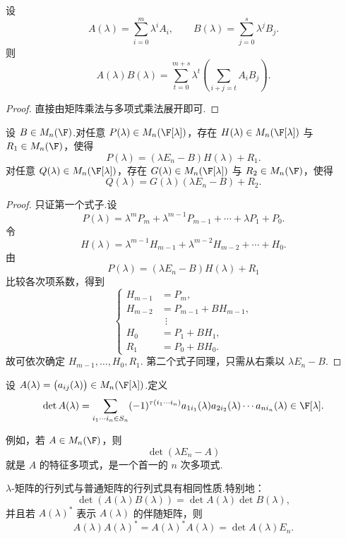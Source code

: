 \begin{lemma}
	设
	\[
	A(\lambda)=\sum_{i=0}^m\lambda^iA_i,
	\qquad
	B(\lambda)=\sum_{j=0}^s\lambda^jB_j.
	\]
	则
	\[
	A(\lambda)B(\lambda)
	=
	\sum_{t=0}^{m+s}\lambda^t
	\left(\sum_{i+j=t}A_iB_j\right).
	\]
\end{lemma}

\begin{proof}
	直接由矩阵乘法与多项式乘法展开即可.
\end{proof}

\begin{lemma}
	设 $B\in M_n(\F)$.对任意 $P(\lambda)\in M_n(\F[\lambda])$，存在 $H(\lambda)\in M_n(\F[\lambda])$ 与 $R_1\in M_n(\F)$，使得
	\[
	P(\lambda)=(\lambda E_n-B)H(\lambda)+R_1.
	\]
	对任意 $Q(\lambda)\in M_n(\F[\lambda])$，存在 $G(\lambda)\in M_n(\F[\lambda])$ 与 $R_2\in M_n(\F)$，使得
	\[
	Q(\lambda)=G(\lambda)(\lambda E_n-B)+R_2.
	\]
\end{lemma}

\begin{proof}
	只证第一个式子.设
	\[
	P(\lambda)=\lambda^mP_m+\lambda^{m-1}P_{m-1}+\cdots+\lambda P_1+P_0.
	\]
	令
	\[
	H(\lambda)=\lambda^{m-1}H_{m-1}+\lambda^{m-2}H_{m-2}+\cdots+H_0.
	\]
	由
	\[
	P(\lambda)=(\lambda E_n-B)H(\lambda)+R_1
	\]
	比较各次项系数，得到
	\[
	\left\{
	\begin{aligned}
		H_{m-1}&=P_m,\\
		H_{m-2}&=P_{m-1}+BH_{m-1},\\
		&\ \ \vdots\\
		H_0&=P_1+BH_1,\\
		R_1&=P_0+BH_0.
	\end{aligned}
	\right.
	\]
	故可依次确定 $H_{m-1},\ldots,H_0,R_1$.
	第二个式子同理，只需从右乘以 $\lambda E_n-B$.
\end{proof}


\begin{definition}\label{p1:concept:c5-l1819}
	设 $A(\lambda)=\bigl(a_{ij}(\lambda)\bigr)\in M_n(\F[\lambda])$.定义
	\[
	\det A(\lambda)
	=
	\sum_{i_1\cdots i_n\in S_n}(-1)^{\tau(i_1\cdots i_n)}
	a_{1i_1}(\lambda)a_{2i_2}(\lambda)\cdots a_{ni_n}(\lambda)
	\in\F[\lambda].
	\]
\end{definition}

例如，若 $A\in M_n(\F)$，则
\[
\det(\lambda E_n-A)
\]
就是 $A$ 的特征多项式，是一个首一的 $n$ 次多项式.

$\lambda$-矩阵的行列式与普通矩阵的行列式具有相同性质.特别地：
\[
\det(A(\lambda)B(\lambda))=\det A(\lambda)\det B(\lambda),
\]
并且若 $A(\lambda)^*$ 表示 $A(\lambda)$ 的伴随矩阵，则
\[
A(\lambda)A(\lambda)^*=A(\lambda)^*A(\lambda)=\det A(\lambda)E_n.
\]


